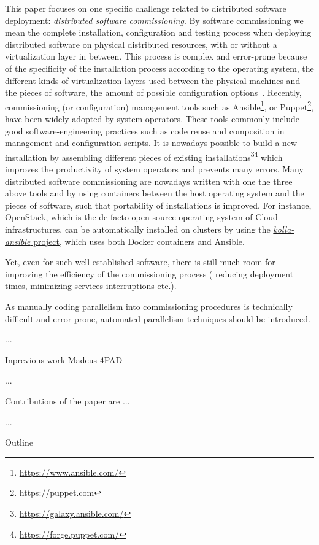 
This paper focuses on one specific challenge related to distributed
software deployment: \emph{distributed software commissioning}. By
software commissioning we mean the complete installation,
configuration and testing process when deploying distributed software
on physical distributed resources, with or without a virtualization
layer in between. This process is complex and error-prone because of
the specificity of the installation process according to the operating
system, the different kinds of virtualization layers used between the
physical machines and the pieces of software, the amount of possible
configuration options~\cite{Xu:2015:SAT:2775083.2791577}. Recently,
commissioning (or configuration) management tools such as
Ansible\footnote{\url{https://www.ansible.com/}}, or
Puppet\footnote{\url{https://puppet.com}}, have been widely adopted by
system operators. These tools commonly include good
software-engineering practices such as code reuse and composition in
management and configuration scripts. It is nowadays possible to build
a new installation by assembling different pieces of existing
installations\footnote{\url{https://galaxy.ansible.com/}}\footnote{\url{https://forge.puppet.com/}}
which improves the productivity of system operators and prevents many
errors. Many distributed software commissioning are nowadays written
with one the three above tools and by using containers between the
host operating system and the pieces of software, such that
portability of installations is improved. For instance, OpenStack,
which is the de-facto open source operating system of Cloud
infrastructures, can be automatically installed on clusters by using
the
\href{https://docs.openstack.org/kolla-ansible/latest/}{\emph{kolla-ansible}
  project}, which uses both Docker containers and Ansible.

Yet, even for such well-established software, there is still much room
for improving the efficiency of the commissioning process (\ie
reducing deployment times, minimizing services interruptions etc.).


As manually coding parallelism into commissioning procedures is
technically difficult and error prone, automated parallelism
techniques should be introduced.

...

Inprevious work Madeus 4PAD

...

Contributions of the paper are ...

...

Outline
